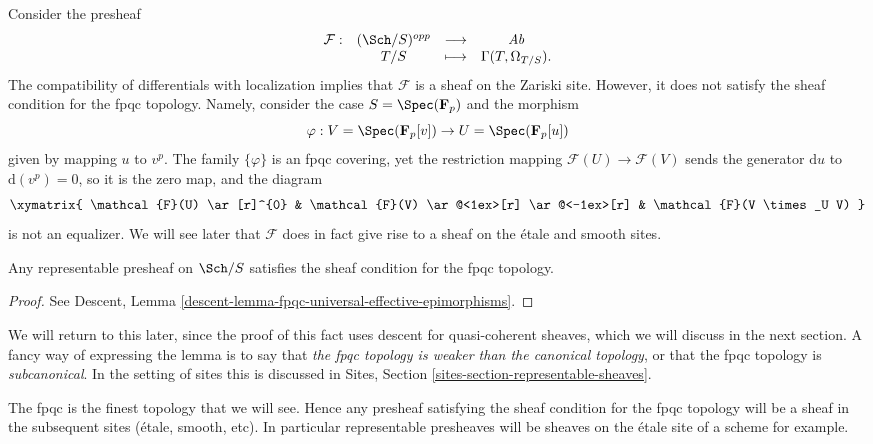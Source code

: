 \begin{example}
\label{example-quasi-coherent}
Consider the presheaf
$$
\begin{matrix}
\mathcal{F} : & (\Sch/S)^{opp} & \longrightarrow & \textit{Ab} \\
& T/S & \longmapsto & \Gamma(T, \Omega_{T/S}).
\end{matrix}
$$
The compatibility of differentials with localization implies that
$\mathcal{F}$ is a sheaf on the Zariski site.
However, it does not satisfy the sheaf condition for the fpqc topology.
Namely, consider the case
$S = \Spec(\mathbf{F}_p)$ and the morphism
$$
\varphi :
V = \Spec(\mathbf{F}_p[v])
\to
U = \Spec(\mathbf{F}_p[u])
$$
given by mapping $u$ to $v^p$. The family $\{\varphi\}$ is an fpqc covering,
yet the restriction mapping
$\mathcal{F}(U) \to \mathcal{F}(V)$
sends the generator $\text{d}u$ to $\text{d}(v^p) = 0$, so
it is the zero map, and the diagram
$$
\xymatrix{
\mathcal{F}(U) \ar[r]^{0} &
\mathcal{F}(V) \ar@<1ex>[r] \ar@<-1ex>[r] &
\mathcal{F}(V \times_U V)
}
$$
is not an equalizer. We will see later that $\mathcal{F}$ does in fact
give rise to a sheaf on the \'etale and smooth sites.
\end{example}

\begin{lemma}
\label{lemma-representable-sheaf-fpqc}
Any representable presheaf on $\Sch/S$ satisfies the
sheaf condition for the fpqc topology.
\end{lemma}

\begin{proof}
See
Descent, Lemma \ref{descent-lemma-fpqc-universal-effective-epimorphisms}.
\end{proof}

\noindent
We will return to this later, since the proof of this fact uses
descent for quasi-coherent sheaves, which we will discuss in the next
section. A fancy way of expressing the lemma is to say that
{\it the fpqc topology is weaker than the canonical topology}, or
that the fpqc topology is {\it subcanonical}. In the setting of sites
this is discussed in
Sites, Section \ref{sites-section-representable-sheaves}.

\begin{remark}
\label{remark-fpqc-finest}
The fpqc is the finest topology that we will see. Hence any presheaf
satisfying the sheaf condition for the fpqc topology will be a
sheaf in the subsequent sites (\'etale, smooth, etc). In particular
representable presheaves will be sheaves on the \'etale site of a scheme
for example.
\end{remark}

